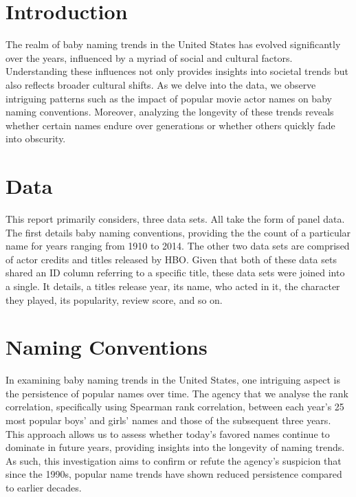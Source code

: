 \documentclass[11pt,preprint, authoryear]{elsarticle}
\numberwithin{equation}{section}
\numberwithin{figure}{section}
\numberwithin{table}{section}
\begin{document}

\headsep 35pt %




\section{Introduction}\label{introduction}

The realm of baby naming trends in the United States has evolved
significantly over the years, influenced by a myriad of social and
cultural factors. Understanding these influences not only provides
insights into societal trends but also reflects broader cultural shifts.
As we delve into the data, we observe intriguing patterns such as the
impact of popular movie actor names on baby naming conventions.
Moreover, analyzing the longevity of these trends reveals whether
certain names endure over generations or whether others quickly fade
into obscurity.

\section{Data}\label{data}

This report primarily considers, three data sets. All take the form of
panel data. The first details baby naming conventions, providing the the
count of a particular name for years ranging from 1910 to 2014. The
other two data sets are comprised of actor credits and titles released
by HBO. Given that both of these data sets shared an ID column referring
to a specific title, these data sets were joined into a single. It
details, a titles release year, its name, who acted in it, the character
they played, its popularity, review score, and so on.

\section{Naming Conventions}\label{naming-conventions}

In examining baby naming trends in the United States, one intriguing
aspect is the persistence of popular names over time. The agency that we
analyse the rank correlation, specifically using Spearman rank
correlation, between each year's 25 most popular boys' and girls' names
and those of the subsequent three years. This approach allows us to
assess whether today's favored names continue to dominate in future
years, providing insights into the longevity of naming trends. As such,
this investigation aims to confirm or refute the agency's suspicion that
since the 1990s, popular name trends have shown reduced persistence
compared to earlier decades.
\end{document}
